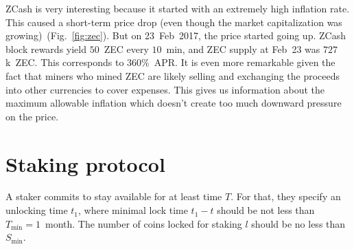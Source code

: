 \documentclass[longbibliography,nofootinbib,twocolumn]{revtex4-1}
\newcommand{\figref}[1]{Fig.~\ref{#1}}
\begin{document}
ZCash is very interesting because it started with an extremely high inflation rate.
This caused a short-term price drop (even though the market capitalization was growing)~(\figref{fig:zec}).
But on 23~Feb~2017, the price started going up.
ZCash block rewards yield $50$~ZEC every $10$~min, and ZEC supply at Feb~23 was $727$k~ZEC.
This corresponds to $360\%$~APR.
It is even more remarkable given the fact that miners who mined ZEC are likely selling and exchanging the proceeds into other currencies to cover expenses.
This gives us information about the maximum allowable inflation which doesn't create too much downward pressure on the price.

\section{Staking protocol}

A staker commits to stay available for at least time $T$.
For that, they specify an unlocking time $t_1$,
where minimal lock time $t_1 - t$ should be not less than $T_{\min} = 1$~month.
The number of coins locked for staking $l$ should be no less than $S_{\min}$.
\end{document}
